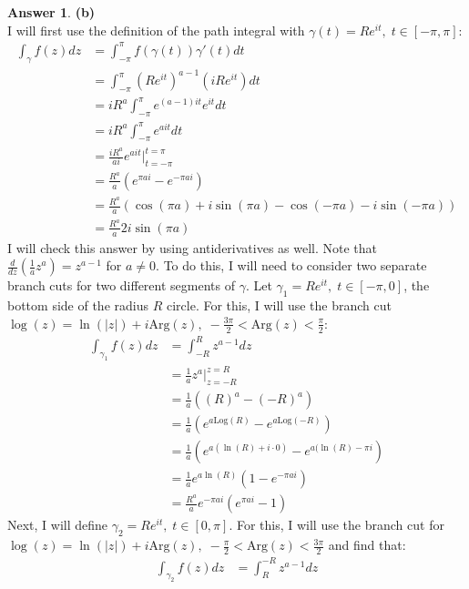 \documentclass[10pt,a4paper]{article}
\theoremstyle{definition}
\newtheorem*{answer*}{Answer}
\begin{document}
\begin{answer*}{\textbf{(b)}}
\\I will first use the definition of the path integral with $\gamma(t) = Re^{it}, \; t \in [-\pi, \pi]$:
\begin{align*}
\int_{\gamma} f(z)dz &= \int_{-\pi}^{\pi} f(\gamma(t))\gamma'(t)dt\\
&= \int_{-\pi}^{\pi} (Re^{it})^{a - 1}(iRe^{it})dt\\
&= iR^a \int_{-\pi}^{\pi} e^{(a - 1)it}e^{it}dt\\
&= iR^a \int_{-\pi}^{\pi} e^{ait}dt\\
&= \frac{iR^a}{ai} e^{ait} \Big|_{t = -\pi}^{t = \pi}\\
&= \frac{R^a}{a}\left(e^{\pi a i} - e^{-\pi ai}\right)\\
&= \frac{R^a}{a}\left(\cos(\pi a) + i\sin(\pi a) - \cos(-\pi a) - i\sin(-\pi a)\right)\\
&= \frac{R^a}{a}2i\sin(\pi a)
\end{align*}
I will check this answer by using antiderivatives as well. Note that $\displaystyle \frac{d}{dz}\left(\frac{1}{a}z^a\right) = z^{a - 1}$ for $a \neq 0$. To do this, I will need to consider two separate branch cuts for two different segments of $\gamma$. Let $\gamma_1 = Re^{it}, \; t \in [-\pi, 0]$, the bottom side of the radius $R$ circle. For this, I will use the branch cut $\log(z) = \ln(|z|) + i\text{Arg}(z), \; -\frac{3\pi}{2} < \text{Arg}(z) < \frac{\pi}{2}$:
\begin{align*}
\int_{\gamma_1} f(z) dz &= \int_{-R}^{R} z^{a - 1}dz\\
&= \frac{1}{a}z^a \Big|_{z = -R}^{z = R}\\
&= \frac{1}{a}\left((R)^a - (-R)^a\right)\\
&= \frac{1}{a}\left(e^{a\text{Log}(R)} - e^{a\text{Log}(-R)}\right)\\
&= \frac{1}{a}\left(e^{a(\ln(R) + i \cdot 0)} - e^{a(\ln(R) - \pi i}\right)\\
&= \frac{1}{a}e^{a\ln(R)}\left(1 - e^{-\pi ai}\right)\\
&= \frac{R^a}{a}e^{-\pi ai}\left(e^{\pi ai} - 1\right)
\end{align*}
Next, I will define $\gamma_2 = Re^{it}, \; t \in [0, \pi]$. For this, I will use the branch cut for $\log(z) = \ln(|z|) + i\text{Arg}(z), \; -\frac{\pi}{2} < \text{Arg}(z) < \frac{3\pi}{2}$ and find that:
\begin{align*}
\int_{\gamma_2}f(z) dz &= \int_{R}^{-R} z^{a - 1} dz\\

\end{align*}
\end{answer*}
\end{document}
